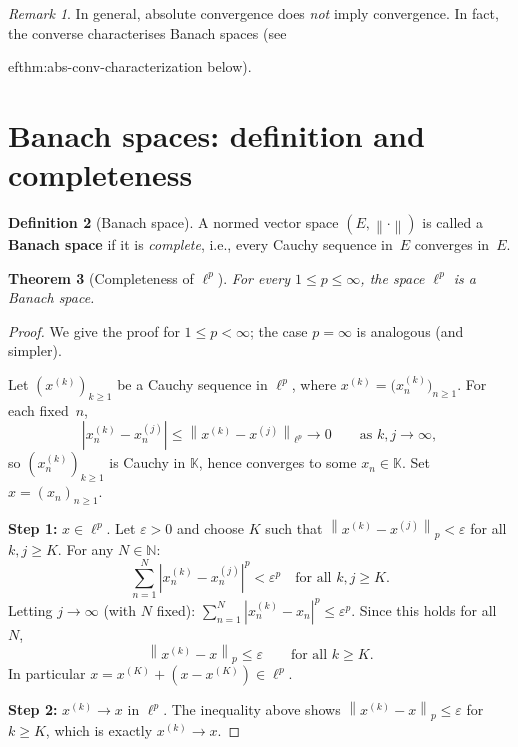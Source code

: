 \documentclass[a4paper,12pt]{book}
\newcommand{\N}{\mathbb{N}}
\newcommand{\K}{\mathbb{K}}
\newcommand{\norm}[1]{\left\| #1 \right\|}
\newcommand{\abs}[1]{\left| #1 \right|}
\theoremstyle{definition}
\newtheorem{definition}{Definition}[chapter]
\theoremstyle{plain}
\newtheorem{theorem}[definition]{Theorem}
\theoremstyle{remark}
\newtheorem{remark}[definition]{Remark}
\begin{document}
\begin{remark}
In general, absolute convergence does \emph{not} imply convergence.
In fact, the converse characterises Banach spaces (see

ef{thm:abs-conv-characterization} below).
\end{remark}

\section{Banach spaces: definition and completeness}
\label{sec:banach-def}

\begin{definition}[Banach space]
\label{def:banach}
A normed vector space $(E,\norm{\cdot})$ is called a \textbf{Banach space}
if it is \emph{complete}, i.e., every Cauchy sequence
in~$E$ converges in~$E$.
\end{definition}

\begin{theorem}[Completeness of $\ell^p$]
\label{thm:ell-p-complete}
For every $1\le p\le\infty$, the space $\ell^p$ is a Banach space.
\end{theorem}

\begin{proof}
We give the proof for $1\le p<\infty$; the case $p=\infty$ is analogous
(and simpler).

Let $(x^{(k)})_{k\ge 1}$ be a Cauchy sequence in $\ell^p$, where
$x^{(k)}=\bigl(x_n^{(k)}\bigr)_{n\ge 1}$.  For each fixed~$n$,
\[
  \abs{x_n^{(k)}-x_n^{(j)}}
  \le \norm{x^{(k)}-x^{(j)}}_{\ell^p} \to 0
  \qquad\text{as }k,j\to\infty,
\]
so $(x_n^{(k)})_{k\ge 1}$ is Cauchy in $\K$, hence converges to some
$x_n\in\K$.  Set $x=(x_n)_{n\ge 1}$.

\textbf{Step 1:} $x\in\ell^p$.  Let $\varepsilon>0$ and choose $K$ such
that $\norm{x^{(k)}-x^{(j)}}_p<\varepsilon$ for all $k,j\ge K$.  For any
$N\in\N$:
\[
  \sum_{n=1}^N \abs{x_n^{(k)}-x_n^{(j)}}^p < \varepsilon^p
  \quad\text{for all }k,j\ge K.
\]
Letting $j\to\infty$ (with $N$ fixed):
$\sum_{n=1}^N\abs{x_n^{(k)}-x_n}^p \le \varepsilon^p$.
Since this holds for all~$N$,
\[
  \norm{x^{(k)}-x}_p \le \varepsilon
  \qquad\text{for all }k\ge K.
\]
In particular $x = x^{(K)}+(x-x^{(K)}) \in \ell^p$.

\textbf{Step 2:} $x^{(k)}\to x$ in $\ell^p$.  The inequality above
shows $\norm{x^{(k)}-x}_p\le\varepsilon$ for $k\ge K$, which is exactly
$x^{(k)}\to x$.
\end{proof}
\end{document}
